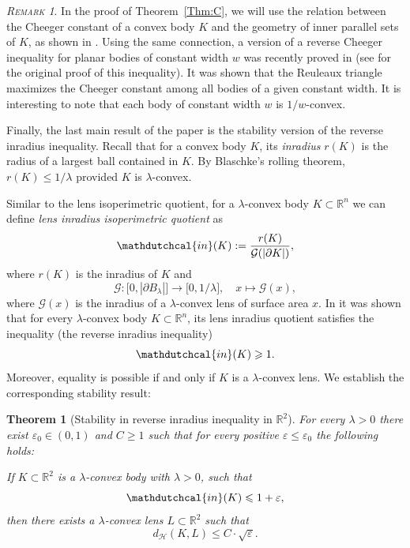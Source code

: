 \documentclass[11pt, oneside]{amsart}
\newcommand{\R}{\mathbb{R}}
\newcommand{\dH}{d_{\mathcal H}}
\newcommand{\Rr}{\mathdutchcal{in}}
\newcommand{\eps}{\varepsilon}
\renewcommand{\ge}{\geqslant}
\renewcommand{\le}{\leqslant}
\theoremstyle{theorem}
\newtheorem{MainTheorem}{Theorem}
\theoremstyle{Intro}
\theoremstyle{definition}
\theoremstyle{remark}
\newtheorem*{remark}{\textsc{Remark}}
\theoremstyle{claim}
\numberwithin{equation}{section}
\begin{document}
\begin{remark}
In the proof of Theorem~\ref{Thm:C}, we will use the relation between the Cheeger constant of a convex body $K$ and the geometry of inner parallel sets of $K$, as shown in \cite{KLR}. Using the same connection, a version of a reverse Cheeger inequality for planar bodies of constant width $w$  was recently proved in \cite{Bog}  (see \cite{HL} for the original proof of this inequality). It was shown that the Reuleaux triangle maximizes the Cheeger constant among all bodies of a given constant width. It is interesting to note that each body of constant width $w$ is $1/w$-convex.   
\end{remark}

Finally, the last main result of the paper is the stability version of the reverse inradius inequality. Recall that for a convex body $K$, its \emph{inradius} $r(K)$ is the radius of a largest ball contained in $K$. By Blaschke's rolling theorem, $r(K) \le 1/\lambda$ provided $K$ is $\lambda$-convex. 

Similar to the lens isoperimetric quotient, for a $\lambda$-convex body $K\subset \R^n$ we can define \emph{lens inradius isoperimetric quotient} as
\[
\Rr(K) := \frac{r(K)}{\mathcal G(|\partial K|)},
\] 
where $r(K)$ is the inradius of $K$ and 
\[
\mathcal G \colon \big[0, |\partial B_\lambda|\big] \to \big[0, 1/\lambda\big], \quad x \mapsto \mathcal G(x),
\]
where $\mathcal G(x)$ is the inradius of a $\lambda$-convex lens of surface area $x$. In \cite{Dr, DrTa, MilInradius} it was shown that for every $\lambda$-convex body $K \subset \mathbb R^n$, its lens inradius quotient satisfies the inequality (the reverse inradius inequality)
\[
\Rr(K) \ge 1.
\]
 Moreover, equality is possible if and only if $K$ is a  $\lambda$-convex lens. We establish the corresponding stability result:

\begin{MainTheorem}[Stability in reverse inradius inequality in $\R^2$]
\label{Thm:B}
For every $\lambda > 0$ there exist $\eps_0 \in (0,1)$ and $C \ge 1$ such that for every positive $\eps \le \eps_0$ the following holds: 

If $K \subset \R^2$ is a $\lambda$-convex body with $\lambda > 0$, such that
\begin{equation}
\label{Eq:Approx}
\Rr(K) \le 1 + \eps,
\end{equation}
then there exists a $\lambda$-convex lens $L \subset \R^2$ such that
\[
\dH(K, L) \le C \cdot \sqrt{\eps}.
\]
\end{MainTheorem}
\end{document}
